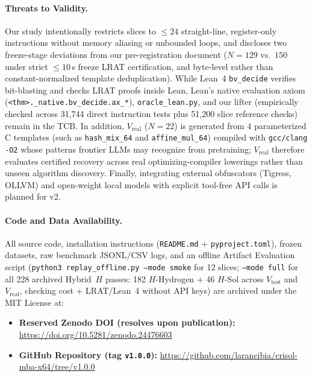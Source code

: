 \documentclass[11pt,a4paper]{article}
\begin{document}
\paragraph{Threats to Validity.}
Our study intentionally restricts slices to $\le 24$ straight-line, register-only instructions without memory aliasing or unbounded loops, and discloses two freeze-stage deviations from our pre-registration document ($N=129$ vs.\ $150$ under strict $\le 10$\,s freeze LRAT certification, and byte-level rather than constant-normalized template deduplication). While Lean~4 \texttt{bv\_decide} verifies bit-blasting and checks LRAT proofs inside Lean, Lean's native evaluation axiom (\texttt{<thm>.\_native.bv\_decide.ax\_*}), \texttt{oracle\_lean.py}, and our lifter (empirically checked across 31,744 direct instruction tests plus 51,200 slice reference checks) remain in the TCB. In addition, $V_{\mathrm{real}}$ ($N=22$) is generated from 4 parameterized C templates (such as \texttt{hash\_mix\_64} and \texttt{affine\_mul\_64}) compiled with \texttt{gcc/clang -O2} whose patterns frontier LLMs may recognize from pretraining; $V_{\mathrm{real}}$ therefore evaluates certified recovery across real optimizing-compiler lowerings rather than unseen algorithm discovery. Finally, integrating external obfuscators (Tigress, OLLVM) and open-weight local models with explicit tool-free API calls is planned for v2.

\paragraph{Code and Data Availability.}
All source code, installation instructions (\texttt{README.md} + \texttt{pyproject.toml}), frozen datasets, raw benchmark JSONL/CSV logs, and an offline Artifact Evaluation script (\texttt{python3 replay\_offline.py --mode smoke} for 12 slices; \texttt{--mode full} for all 228 archived Hybrid~$H$ passes: 182 $H$-Hydrogen + 46 $H$-Sol across $V_{\mathrm{test}}$ and $V_{\mathrm{real}}$, checking cost + LRAT/Lean~4 without API keys) are archived under the MIT License at:
\begin{itemize}[leftmargin=1.5em]
  \item \textbf{Reserved Zenodo DOI (resolves upon publication):} \url{https://doi.org/10.5281/zenodo.24476603}
  \item \textbf{GitHub Repository (tag \texttt{v1.0.0}):} \url{https://github.com/larancibia/crisol-mba-x64/tree/v1.0.0}
\end{itemize}
\end{document}
